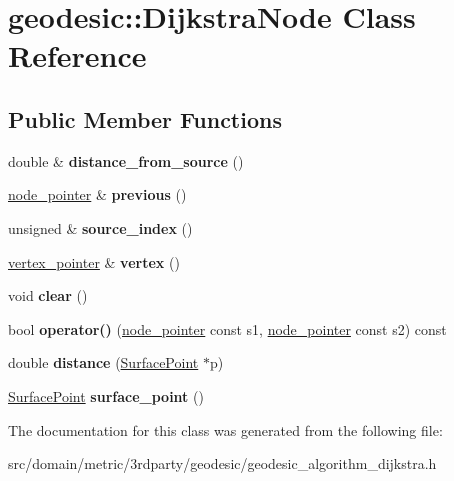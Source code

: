 \hypertarget{classgeodesic_1_1_dijkstra_node}{}\section{geodesic\+:\+:Dijkstra\+Node Class Reference}
\label{classgeodesic_1_1_dijkstra_node}
\subsection*{Public Member Functions}
\begin{DoxyCompactItemize}
\item 
\hypertarget{classgeodesic_1_1_dijkstra_node_a99d02fd851e23c492aa1eeff4f67a7d7}{}double \& {\bfseries distance\+\_\+from\+\_\+source} ()\label{classgeodesic_1_1_dijkstra_node_a99d02fd851e23c492aa1eeff4f67a7d7}

\item 
\hypertarget{classgeodesic_1_1_dijkstra_node_a4c1a78e5803d668edd78af52388844ad}{}\hyperlink{classgeodesic_1_1_dijkstra_node}{node\+\_\+pointer} \& {\bfseries previous} ()\label{classgeodesic_1_1_dijkstra_node_a4c1a78e5803d668edd78af52388844ad}

\item 
\hypertarget{classgeodesic_1_1_dijkstra_node_afd2f3fc288efa56371142da3f3d40161}{}unsigned \& {\bfseries source\+\_\+index} ()\label{classgeodesic_1_1_dijkstra_node_afd2f3fc288efa56371142da3f3d40161}

\item 
\hypertarget{classgeodesic_1_1_dijkstra_node_ad305dc92e8fb46bb7309473bffc29f80}{}\hyperlink{classgeodesic_1_1_vertex}{vertex\+\_\+pointer} \& {\bfseries vertex} ()\label{classgeodesic_1_1_dijkstra_node_ad305dc92e8fb46bb7309473bffc29f80}

\item 
\hypertarget{classgeodesic_1_1_dijkstra_node_ab8c56944371a9da0e9532e8cc8e7e153}{}void {\bfseries clear} ()\label{classgeodesic_1_1_dijkstra_node_ab8c56944371a9da0e9532e8cc8e7e153}

\item 
\hypertarget{classgeodesic_1_1_dijkstra_node_a8ff6eb08aacd8a75b509ea2a3640b99d}{}bool {\bfseries operator()} (\hyperlink{classgeodesic_1_1_dijkstra_node}{node\+\_\+pointer} const s1, \hyperlink{classgeodesic_1_1_dijkstra_node}{node\+\_\+pointer} const s2) const \label{classgeodesic_1_1_dijkstra_node_a8ff6eb08aacd8a75b509ea2a3640b99d}

\item 
\hypertarget{classgeodesic_1_1_dijkstra_node_aa21bf0c4f5b858731ef2103663728c37}{}double {\bfseries distance} (\hyperlink{classgeodesic_1_1_surface_point}{Surface\+Point} $\ast$p)\label{classgeodesic_1_1_dijkstra_node_aa21bf0c4f5b858731ef2103663728c37}

\item 
\hypertarget{classgeodesic_1_1_dijkstra_node_a0376f6231c4b485561418cff249939b4}{}\hyperlink{classgeodesic_1_1_surface_point}{Surface\+Point} {\bfseries surface\+\_\+point} ()\label{classgeodesic_1_1_dijkstra_node_a0376f6231c4b485561418cff249939b4}

\end{DoxyCompactItemize}


The documentation for this class was generated from the following file\+:\begin{DoxyCompactItemize}
\item 
src/domain/metric/3rdparty/geodesic/geodesic\+\_\+algorithm\+\_\+dijkstra.\+h\end{DoxyCompactItemize}
